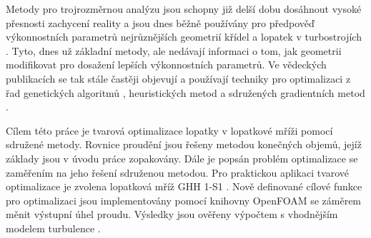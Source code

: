 Metody pro trojrozměrnou analýzu jsou schopny již delší dobu dosáhnout vysoké přesnosti zachycení reality a jsou dnes běžně používány pro předpověď výkonnostních parametrů nejrůznějších geometrií křídel a lopatek v turbostrojích \cite{karman1997inverse}. 
Tyto, dnes už základní metody, ale nedávají informaci o tom, jak geometrii modifikovat pro dosažení lepších výkonnostních parametrů. 
Ve vědeckých publikacích se tak stále častěji objevují a používají techniky pro optimalizaci z řad genetických algoritmů \cite{karman2000genetic, yang2020nature}, heuristických metod \cite{vstefek2011benchmarking} a sdružených gradientních metod \cite{karman1997inverse}.

Cílem této práce je tvarová optimalizace lopatky v lopatkové mříži pomocí sdružené metody. Rovnice proudění jsou řešeny metodou konečných objemů, jejíž základy jsou v úvodu práce zopakovány. Dále je popsán problém optimalizace se zaměřením na jeho řešení sdruženou metodou. Pro praktickou aplikaci tvarové optimalizace je zvolena lopatková mříž GHH 1-S1 \cite{steinert1990design}. Nově definované cílové funkce pro optimalizaci jsou implementovány pomocí knihovny OpenFOAM se záměrem měnit výstupní úhel proudu. Výsledky jsou ověřeny výpočtem s vhodnějším modelem turbulence \cite{menter2003ten}.














